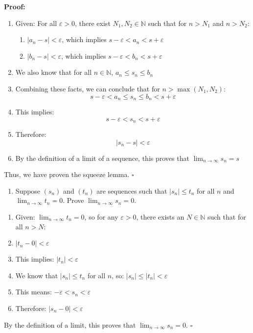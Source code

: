 \documentclass{article}
\begin{document}
\textbf{Proof:}
\begin{enumerate}
    \item Given: For all $\varepsilon > 0$, there exist $N_1, N_2 \in \mathbb{N}$ such that for $n > N_1$ and $n > N_2$:
    \begin{enumerate}
        \item $|a_n - s| < \varepsilon$, which implies $s - \varepsilon < a_n < s + \varepsilon$
        \item $|b_n - s| < \varepsilon$, which implies $s - \varepsilon < b_n < s + \varepsilon$
    \end{enumerate}
    \item We also know that for all $n \in \mathbb{N}$, $a_n \leq s_n \leq b_n$
    \item Combining these facts, we can conclude that for $n > \max(N_1, N_2)$:
    $$
    s - \varepsilon < a_n \leq s_n \leq b_n < s + \varepsilon
    $$
    \item This implies:
    $$
    s - \varepsilon < s_n < s + \varepsilon
    $$
    \item Therefore:
    $$
    |s_n - s| < \varepsilon
    $$
    \item By the definition of a limit of a sequence, this proves that $\lim_{n \to \infty} s_n = s$
\end{enumerate}

Thus, we have proven the squeeze lemma. $\square$

\begin{enumerate}[resume]
    \item Suppose $(s_{n})$ and $(t_{n})$ are sequences such that $|s_{n}|\leq t_{n}$ for all $n$ and $\lim_{ n \to \infty }t_{n}=0$. Prove $\lim_{ n \to \infty }s_{n}=0$.
\end{enumerate}
\begin{enumerate}
    \item Given: $\lim_{n \to \infty} t_n = 0$, so for any $\varepsilon > 0$, there exists an $N \in \mathbb{N}$ such that for all $n > N$:
    \item $|t_n - 0| < \varepsilon$
    \item This implies: $|t_n| < \varepsilon$
    \item We know that $|s_n| \leq t_n$ for all $n$, so: $|s_n| \leq |t_n| < \varepsilon$
    \item This means: $-\varepsilon < s_n < \varepsilon$
    \item Therefore: $|s_n - 0| < \varepsilon$
\end{enumerate}
By the definition of a limit, this proves that $\lim_{n \to \infty} s_n = 0$. $\square$
\end{document}
